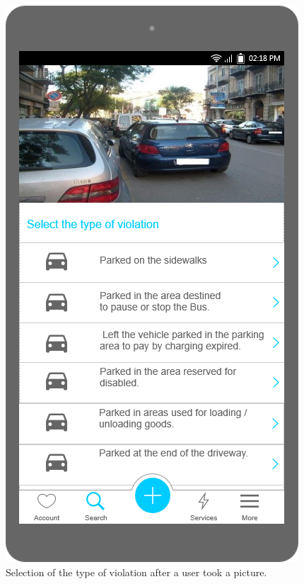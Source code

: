 \documentclass[a4paper]{article}
\newcommand{\mockupsize}{0.36\textwidth}
\begin{document}
\vfill
\newpage

\begin{figure}[H]
    \centering
    \begin{minipage}[t]{\mockupsize}
        \includegraphics[width=\textwidth]{mockup/select_violation}
        \caption{Selection of the type of violation after a user took a
picture.}
    \end{minipage}

\end{figure}
\end{document}
